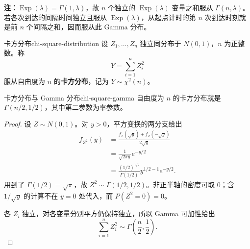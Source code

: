 \textbf{注：}\quad $\operatorname{Exp}(\lambda)=\Gamma(1,\lambda)$，故 $n$ 个独立的 $\operatorname{Exp}(\lambda)$ 变量之和服从 $\Gamma(n,\lambda)$。若各次到达的间隔时间独立且服从 $\operatorname{Exp}(\lambda)$，从起点计时的第 $n$ 次到达时刻就是前 $n$ 个间隔之和，因而服从此 Gamma 分布。

\begin{mydefinition}{卡方分布}{chi-square-distribution}
设 $Z_1,\ldots,Z_n$ 独立同分布于 $N(0,1)$，$n$ 为正整数。称
\[
Y=\sum_{i=1}^nZ_i^2
\]
服从自由度为 $n$ 的\textbf{卡方分布}，记为 $Y\sim\chi^2(n)$。
\end{mydefinition}

\begin{proposition}{卡方分布与 Gamma 分布}{chi-square-gamma}
自由度为 $n$ 的卡方分布就是 $\Gamma(n/2,1/2)$，其中第二参数为率参数。
\end{proposition}
\begin{proof}
设 $Z\sim N(0,1)$。对 $y>0$，平方变换的两分支给出
\begin{align*}
f_{Z^2}(y)
&=\frac{f_Z(\sqrt y)+f_Z(-\sqrt y)}{2\sqrt y}\\
&=\frac1{\sqrt{2\pi y}}e^{-y/2}\\
&=\frac{(1/2)^{1/2}}{\Gamma(1/2)}y^{1/2-1}e^{-y/2}.
\end{align*}
用到了 $\Gamma(1/2)=\sqrt\pi$，故 $Z^2\sim\Gamma(1/2,1/2)$。非正半轴的密度可取 $0$；含 $1/\sqrt y$ 的计算不在 $y=0$ 处代入，而 $P(Z^2=0)=0$。

各 $Z_i$ 独立，对各变量分别平方仍保持独立，所以 Gamma 可加性给出
\[
\sum_{i=1}^nZ_i^2\sim\Gamma\left(\frac n2,\frac12\right).
\]
\end{proof}


